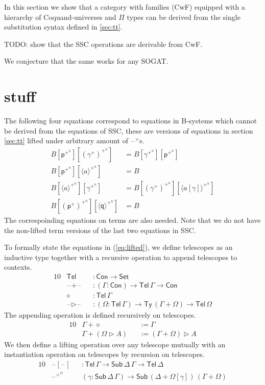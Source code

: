 \documentclass[sigplan,10pt,anonymous,review]{acmart}\settopmatter{printfolios=true,printccs=false,printacmref=false}
\newcommand{\ra}{\rightarrow}
\newcommand{\Set}{\mathsf{Set}}
\newcommand{\Ty}{\mathsf{Ty}}
\newcommand{\Con}{\mathsf{Con}}
\newcommand{\Sub}{\mathsf{Sub}}
\newcommand{\Tel}{\mathsf{Tel}}
\newcommand{\p}{\mathsf{p}}
\newcommand{\q}{\mathsf{q}}
\newcommand{\ext}{\mathop{\triangleright}}
\newcommand{\blank}{\mathord{\hspace{1pt}\text{--}\hspace{1pt}}} %
\begin{document}
In this section we show that a category with families (CwF) equipped
with a hierarchy of Coquand-universes and $\Pi$ types can be derived
from the single substitution syntax defined in \autoref{sec:tt}.

TODO: show that the SSC operations are derivable from CwF.

We conjecture that the same works for any SOGAT.

\section{stuff}

The following four equations correspond to equations in B-systems which cannot
be derived from the equations of SSC, these are versions of equations in section
\ref{sec:tt} lifted under arbitrary amount of $\blank^+$s.
\begin{equation}\label{eq:lifted}
\begin{aligned}
  B[\p^{+^n}][(\gamma^+)^{+^n}] & = B[\gamma^{+^n}][\p^{+^n}] \\
  B[\p^{+^n}][\langle a \rangle^{+^n}] & = B \\
  B[\langle a \rangle^{+^n}][\gamma^{+^n}] & = B[(\gamma^+)^{+^n}][\langle a[\gamma] \rangle^{+^n}] \\
  B[(\p^+)^{+^n}][\langle\q\rangle^{+^n}] & = B
\end{aligned}
\end{equation}
The correspoinding equations on terms are also needed. Note that we do not have
the non-lifted term versions of the last two equations in SSC.

To formally state the equations in (\ref{eq:lifted}), we define telescopes as an
inductive type together with a recursive operation to append telescopes to
contexts.
\begin{alignat*}{10}
  & \Tel && : \Con\ra\Set \\
  & \blank+\blank && : (\Gamma:\Con)\ra\Tel\,\Gamma\ra\Con \\
  & \diamond && : \Tel\,\Gamma \\
  & \blank\ext\blank && : (\Omega:\Tel\,\Gamma)\ra\Ty\,(\Gamma+\Omega)\ra\Tel\,\Omega
\end{alignat*}
The appending operation is defined recursively on telescopes.
\begin{alignat*}{10}
  & \Gamma+\diamond && := \Gamma \\
  & \Gamma+(\Omega\ext A) && := (\Gamma+\Omega)\ext A
\end{alignat*}
We then define a lifting operation over any telescope mutually with an
instantiation operation on telescopes by recursion on telescopes.
\begin{alignat*}{10}
  & \blank[\blank] && : \Tel\,\Gamma\ra\Sub\,\Delta\,\Gamma\ra\Tel\,\Delta \\
  & \blank^{+^\Omega} && (\gamma:\Sub\,\Delta\,\Gamma)\ra\Sub\,(\Delta+\Omega[\gamma])\,(\Gamma+\Omega)
\end{alignat*}
\end{document}
